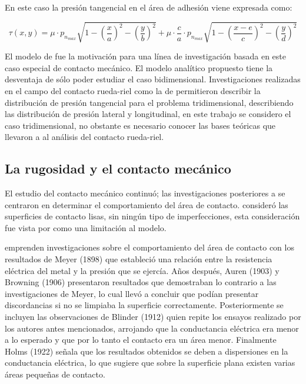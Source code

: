 \documentclass[main]{subfiles}
\begin{document}
  En este caso la presión tangencial en el área de adhesión viene expresada como:

  \begin{equation}
  \label{eq:Eq12}
  \tau (x,y)=
  \mu \cdot p_{n_{max}}\sqrt{
  1-
  \left(\frac{x}{a}\right)^2
  -\left(\frac{y}{b}\right)^2}
  +
  \mu \cdot \frac{c}{a} \cdot p_{n_{max}}\sqrt{
  1-
  \left(\frac{x-e}{c}\right)^2
  -\left(\frac{y}{d}\right)^2}
  \end{equation}
  
 El modelo de \citet{Carter1926} fue la motivación para una línea de investigación basada en este caso especial de contacto mecánico. El modelo analítico propuesto tiene la desventaja de sólo poder estudiar el caso bidimensional. Investigaciones realizadas en el campo del contacto rueda-riel como la de \citet{Kalker1971VSD} permitieron describir la distribución de presión tangencial para el problema tridimensional, describiendo las distribución de presión lateral y longitudinal, en este trabajo se considero el caso tridimensional, no obstante es necesario conocer las bases teóricas que llevaron a al análisis del contacto rueda-riel.

\subsection{La rugosidad y el contacto mecánico}
  
El estudio del contacto mecánico continuó; las investigaciones posteriores a \citet{Herz1881} se centraron en determinar el comportamiento del área de contacto. \citet{Herz1881} consideró las superficies de contacto lisas, sin ningún tipo de imperfecciones, esta consideración fue vista por \citet{Bowden07021939} como una limitación al modelo.

\citet{Bowden07021939} emprenden investigaciones sobre el comportamiento del área de contacto  con los resultados de Meyer (1898) que estableció una relación entre la resistencia eléctrica del metal y la presión que se ejercía.  
Años después, Auren (1903) y Browning (1906) presentaron resultados que demostraban lo contrario a las investigaciones de Meyer, lo cual llevó a concluir que podían presentar discordancias si no se limpiaba la superficie correctamente. Posteriormente se incluyen las observaciones de Blinder (1912) quien repite los ensayos realizado por los autores antes mencionados, arrojando que la conductancia eléctrica era menor a lo esperado y que por lo tanto el contacto era un área menor. Finalmente Holms (1922) señala que los resultados obtenidos se deben a dispersiones en la conductancia eléctrica, lo que sugiere que sobre la superficie plana existen varias áreas pequeñas de contacto.
  
\end{document}
